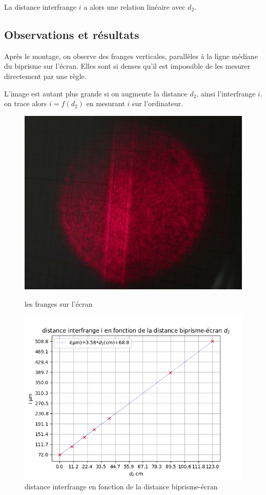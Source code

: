 \documentclass[11pt, a4paper]{article}
\begin{document}
La distance interfrange $i$ a alors une relation linéaire avec $d_2$.
\subsection{Observations et résultats}
Après le montage, on observe des franges verticales, parallèles à la ligne médiane du biprisme sur l'écran. Elles sont si denses qu'il est impossible de les mesurer directement par une règle.

L'image est autant plus grande si on augmente la distance $d_2$, ainsi l'interfrange $i$. on trace alors $i=f(d_2)$ en mesurant $i$ sur l'ordinateur.

\begin{figure}[htbp]
    \centering
    \begin{minipage}[t]{0.48\textwidth}
        \centering
        \includegraphics[width=\textwidth]{photo}
        \caption{les franges sur l'écran}
        \label{photo}
    \end{minipage}
    \hfill
    \begin{minipage}[t]{0.48\textwidth}
        \centering
        \includegraphics[width=\textwidth]{2.1}
        \caption{distance interfrange en fonction de la distance biprisme-écran}
        \label{courbe1}
    \end{minipage}
\end{figure}
\end{document}

